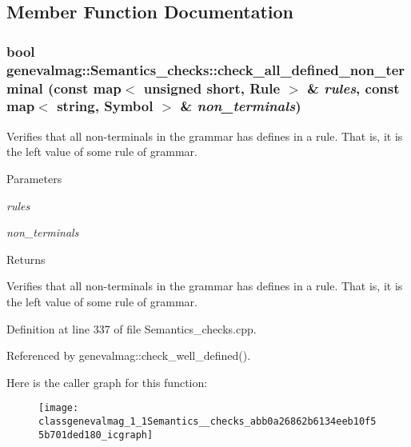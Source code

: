 \subsection{Member Function Documentation}
\hypertarget{classgenevalmag_1_1Semantics__checks_abb0a26862b6134eeb10f55b701ded180}{
\subsubsection[{check\_\-all\_\-defined\_\-non\_\-terminal}]{\setlength{\rightskip}{0pt plus 5cm}bool genevalmag::Semantics\_\-checks::check\_\-all\_\-defined\_\-non\_\-terminal (const map$<$ unsigned short, {\bf Rule} $>$ \& {\em rules}, \/  const map$<$ string, {\bf Symbol} $>$ \& {\em non\_\-terminals})}}
\label{classgenevalmag_1_1Semantics__checks_abb0a26862b6134eeb10f55b701ded180}
Verifies that all non-\/terminals in the grammar has defines in a rule. That is, it is the left value of some rule of grammar.


\begin{DoxyParams}{Parameters}
\item[{\em rules}]\item[{\em non\_\-terminals}]\end{DoxyParams}
\begin{DoxyReturn}{Returns}

\end{DoxyReturn}
Verifies that all non-\/terminals in the grammar has defines in a rule. That is, it is the left value of some rule of grammar. 

Definition at line 337 of file Semantics\_\-checks.cpp.



Referenced by genevalmag::check\_\-well\_\-defined().



Here is the caller graph for this function:\nopagebreak
\begin{figure}[H]
\begin{center}
\leavevmode
\texttt{[image: classgenevalmag\_1\_1Semantics\_\_checks\_abb0a26862b6134eeb10f55b701ded180\_icgraph]}
\end{center}
\end{figure}


